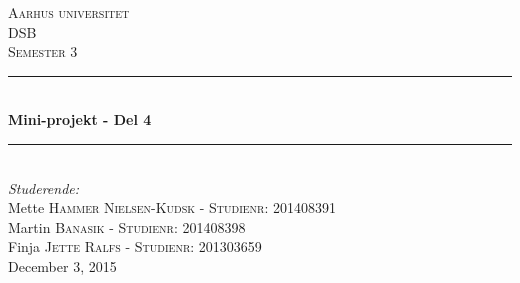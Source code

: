 \documentclass[12pt, letterpaper]{article}
\begin{document}
\begin{titlepage}

\newcommand{\HRule}{\rule{\linewidth}{0.5mm}} %

\center %
 

\textsc{\LARGE Aarhus universitet}\\[1.5cm] %
\textsc{\Large DSB}\\[0.5cm] %
\textsc{\large Semester 3}\\[0.5cm] %


\HRule \\[0.4cm]
{ \huge \bfseries Mini-projekt - Del 4}\\[0.4cm] %
\HRule \\[1.5cm]
 

\Large \emph{Studerende:}\\[1cm]
Mette \textsc{Hammer Nielsen-Kudsk - Studienr: 201408391}\\[0,5cm] %
Martin \textsc{Banasik - Studienr: 201408398}\\[0,5cm] %
Finja \textsc{Jette Ralfs - Studienr: 201303659}\\[0,5cm] %

{\large December 3, 2015}\\[1,2cm] %


\end{titlepage}
\end{document}
